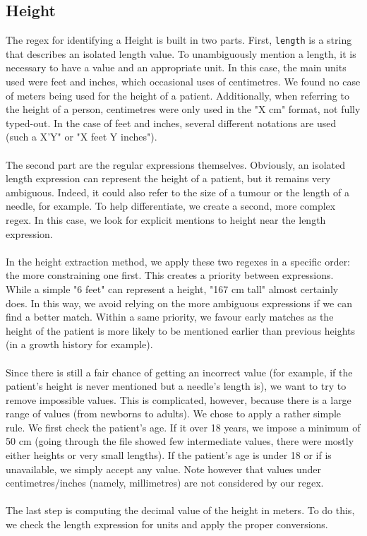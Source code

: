 \documentclass[10pt, a4paper, oneside]{article} %
\begin{document}
\subsection*{Height}
The regex for identifying a Height is built in two parts. First, \texttt{length} is a string that describes an isolated length value. To unambiguously mention a length, it is necessary to have a value and an appropriate unit. In this case, the main units used were feet and inches, which occasional uses of centimetres. We found no case of meters being used for the height of a patient. Additionally, when referring to the height of a person, centimetres were only used in the "X cm" format, not fully typed-out. In the case of feet and inches, several different notations are used (such a X'Y" or "X feet Y inches").\\
\\
The second part are the regular expressions themselves. Obviously, an isolated length expression can represent the height of a patient, but it remains very ambiguous. Indeed, it could also refer to the size of a tumour or the length of a needle, for example. To help differentiate, we create a second, more complex regex. In this case, we look for explicit mentions to height near the length expression.\\
\\
In the height extraction method, we apply these two regexes in a specific order: the more constraining one first. This creates a priority between expressions. While a simple "6 feet" can represent a height, "167  cm tall" almost certainly does. In this way, we avoid relying on the more ambiguous expressions if we can find a better match. Within a same priority, we favour early matches as the height of the patient is more likely to be mentioned earlier than previous heights (in a growth history for example).\\
\\
Since there is still a fair chance of getting an incorrect value (for example, if the patient's height is never mentioned but a needle's length is), we want to try to remove impossible values. This is complicated, however, because there is a large range of values (from newborns to adults). We chose to apply a rather simple rule. We first check the patient's age. If it over 18 years, we impose a minimum of 50 cm (going through the file showed few intermediate values, there were mostly either heights or very small lengths). If the patient's age is under 18 or if is unavailable, we simply accept any value. Note however that values under centimetres/inches (namely, millimetres) are not considered by our regex. \\
\\
The last step is computing the decimal value of the height in meters. To do this, we check the length expression for units and apply the proper conversions.
\end{document}
